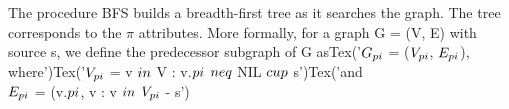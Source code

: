 \documentclass[preview]{standalone}
\begin{document}
\begin{center}
{The procedure BFS builds a breadth-first tree as it searches the graph. The tree corresponds to the $\pi$ attributes. More formally, for a graph G = (V, E) with source s, we define the predecessor subgraph of G asTex('$G_{\\pi}$ = ($V_{\\pi}$, $E_{\\pi}$), where')Tex('$V_{\\pi}$ = {v $\\in$ V : v.$\\pi$ $\\neq$ NIL} $\\cup$ {s}')Tex('and \\ $E_{\\pi}$ = {(v.$\\pi$, v} : v $\\in$ $V_{\\pi}$ - {s}}')
\end{center}
\end{document}

